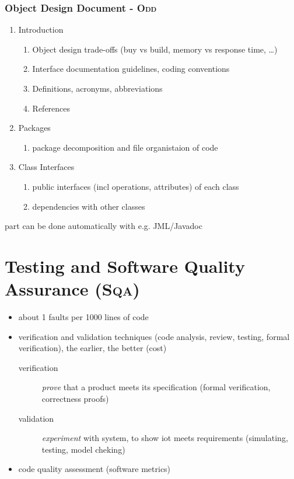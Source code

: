 \documentclass[a4paper, 10pt]{article}
\begin{document}
\subsubsection*{Object Design Document - \textsc{Odd}}
\begin{enumerate}
	\item Introduction
	\begin{enumerate}
		\item Object design trade-offs (buy vs build, memory vs response time, \dots)
		\item Interface documentation guidelines, coding conventions
		\item Definitions, acronyms, abbreviations
		\item References
	\end{enumerate}
	\item Packages
	\begin{enumerate}
		\item package decomposition and file organistaion of code
	\end{enumerate}
	\item Class Interfaces
	\begin{enumerate}
		\item public interfaces (incl operations, attributes) of each class
		\item dependencies with other classes
	\end{enumerate}
\end{enumerate}
{\tiny part can be done automatically with e.g. JML/Javadoc}

\section*{Testing and Software Quality Assurance (\textsc{Sqa})}
\begin{itemize}
	\item about 1 faults per 1000 lines of code
	\item verification and validation techniques (code analysis, review, testing, formal verification), the earlier, the better (cost)
	\begin{description}
		\item[verification] \emph{prove} that a product meets its specification (formal verification, correctness proofs)
		\item[validation] \emph{experiment} with system, to show iot meets requirements (simulating, testing, model cheking)
	\end{description}
	\item code quality assessment (software metrics)
\end{itemize}
\end{document}
